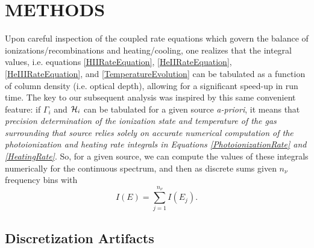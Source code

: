 \documentclass[preprint2]{aastex}              %
\begin{document}
\section{METHODS}
Upon careful inspection of the coupled rate equations which govern the balance of ionizations/recombinations and heating/cooling, one realizes that the integral values, i.e. equations \ref{HIIRateEquation}, \ref{HeIIRateEquation}, \ref{HeIIIRateEquation}, and \ref{TemperatureEvolution} can be tabulated as a function of column density (i.e. optical depth), allowing for a significant speed-up in run time.  The key to our subsequent analysis was inspired by this same convenient feature: if $\Gamma_i$ and $\mathcal{H}_i$ can be tabulated for a given source \textit{a-priori}, it means that \textit{precision determination of the ionization state and temperature of the gas surrounding that source relies solely on accurate numerical computation of the photoionization and heating rate integrals in Equations \ref{PhotoionizationRate} and \ref{HeatingRate}}.  So, for a given source, we can compute the values of these integrals numerically for the continuous spectrum, and then as discrete sums given $n_{\nu}$ frequency bins with 
\begin{equation}
    I(E) = \sum_{j=1}^{n_{\nu}} I(E_j) .
\end{equation}


\subsection{Discretization Artifacts}


\end{document}

